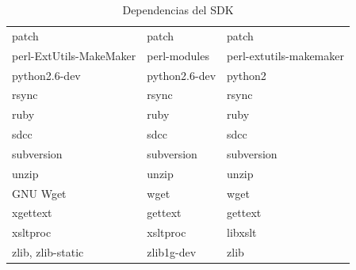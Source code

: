 \documentclass[12pt, twoside]{article}
\begin{document}
\begin{table}[h!]
{\begin{tabular}{|l|l|l|}
                    patch                   & patch             & patch                     \\
                    perl-ExtUtils-MakeMaker & perl-modules      & perl-extutils-makemaker   \\
                    python2.6-dev           & python2.6-dev     & python2                   \\
                    rsync                   & rsync             & rsync                     \\
                    ruby                    & ruby              & ruby                      \\
                    sdcc                    & sdcc              & sdcc                      \\
                    subversion              & subversion        & subversion                \\
                    unzip                   & unzip             & unzip                     \\
                    GNU Wget                & wget              & wget                      \\
                    xgettext                & gettext           & gettext                   \\
                    xsltproc                & xsltproc          & libxslt                   \\
                    zlib, zlib-static       & zlib1g-dev        & zlib                      \\
                    \hline
                \end{tabular}
            }
        \caption{Dependencias del SDK}
        \label{tab:sdk_dependences}
    \end{table}
\end{document}
